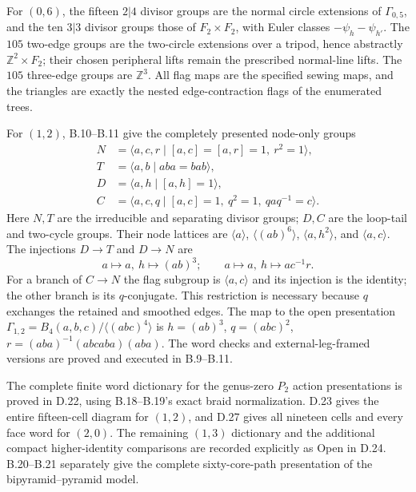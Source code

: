 For $(0,6)$, the fifteen $2|4$ divisor groups are the normal circle extensions of $\Gamma_{0,5}$, and the ten $3|3$ divisor groups those of $F_2\times F_2$, with Euler classes $-\psi_h-\psi_{h'}$. The $105$ two-edge groups are the two-circle extensions over a tripod, hence abstractly $\mathbb Z^2\times F_2$; their chosen peripheral lifts remain the prescribed normal-line lifts. The $105$ three-edge groups are $\mathbb Z^3$. All flag maps are the specified sewing maps, and the triangles are exactly the nested edge-contraction flags of the enumerated trees.

For $(1,2)$, B.10--B.11 give the completely presented node-only groups
\[
\begin{aligned}
 N&=\langle a,c,r\mid [a,c]=[a,r]=1,\ r^2=1\rangle,\\
 T&=\langle a,b\mid aba=bab\rangle,\\
 D&=\langle a,h\mid[a,h]=1\rangle,\\
 C&=\langle a,c,q\mid[a,c]=1,\ q^2=1,\ qaq^{-1}=c\rangle.
\end{aligned}
\]
Here $N,T$ are the irreducible and separating divisor groups; $D,C$ are the loop-tail and two-cycle groups. Their node lattices are $\langle a\rangle$, $\langle(ab)^6\rangle$, $\langle a,h^2\rangle$, and $\langle a,c\rangle$. The injections $D\to T$ and $D\to N$ are
\[
 a\mapsto a,\ h\mapsto(ab)^3;\qquad
 a\mapsto a,\ h\mapsto ac^{-1}r.
\]
For a branch of $C\to N$ the flag subgroup is $\langle a,c\rangle$ and its injection is the identity; the other branch is its $q$-conjugate. This restriction is necessary because $q$ exchanges the retained and smoothed edges. The map to the open presentation
$\Gamma_{1,2}=B_4(a,b,c)/\langle(abc)^4\rangle$
is
$h=(ab)^3$, $q=(abc)^2$, $r=(aba)^{-1}(abcaba)(aba)$.
The word checks and external-leg-framed versions are proved and executed in B.9--B.11.

The complete finite word dictionary for the genus-zero $P_2$ action presentations is proved in D.22, using B.18--B.19's exact braid normalization.  D.23 gives the entire fifteen-cell diagram for $(1,2)$, and D.27 gives all nineteen cells and every face word for $(2,0)$.  The remaining $(1,3)$ dictionary and the additional compact higher-identity comparisons are recorded explicitly as Open in D.24.  B.20--B.21 separately give the complete sixty-core-path presentation of the bipyramid--pyramid model.
